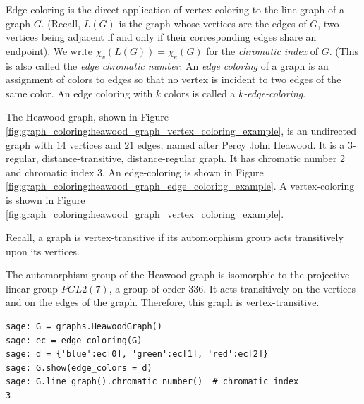 Edge coloring is the direct application of vertex coloring to the
line graph of a graph $G$. (Recall, $L(G)$ is the graph whose
vertices are the edges of $G$, two vertices being adjacent if and
only if their corresponding edges share an endpoint).
We write $\chi_v(L(G)) = \chi_e(G)$ for the {\it chromatic index} of $G$.
(This is also called the {\it edge chromatic number}.
An {\it edge coloring} of a graph is an assignment of colors to
edges so that no vertex is
incident to two edges of the same color. An edge coloring with
$k$ colors is called a {\it $k$-edge-coloring}.

\begin{example}
\label{eg:graph_coloring:heawood_graph_example}
The Heawood graph, shown in Figure
\ref{fig:graph_coloring:heawood_graph_vertex_coloring_example},
is an undirected graph with $14$ vertices and $21$ edges, named after
Percy John Heawood.
It is a $3$-regular, distance-transitive, distance-regular graph.
It has chromatic number $2$ and chromatic index $3$.
An edge-coloring is shown in Figure
\ref{fig:graph_coloring:heawood_graph_edge_coloring_example}.
A vertex-coloring is shown in Figure
\ref{fig:graph_coloring:heawood_graph_vertex_coloring_example}.

Recall, a graph is vertex-transitive if its automorphism
group acts transitively upon its vertices.

The automorphism group of the Heawood graph is isomorphic to the
projective linear group $PGL2(7)$, a group of order $336$. It acts
transitively on the vertices and on the edges of the
graph. Therefore, this graph is vertex-transitive.
\end{example}

\begin{lstlisting}
sage: G = graphs.HeawoodGraph()
sage: ec = edge_coloring(G)
sage: d = {'blue':ec[0], 'green':ec[1], 'red':ec[2]}
sage: G.show(edge_colors = d)
sage: G.line_graph().chromatic_number()  # chromatic index
3
\end{lstlisting}

